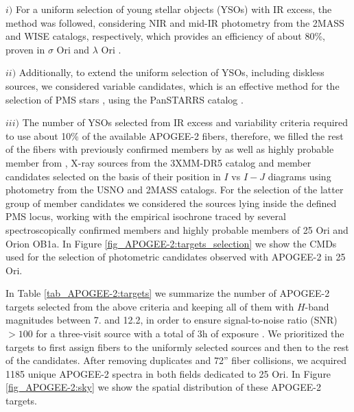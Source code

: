 \documentclass[12pt]{article}
\begin{document}
$i)$ For a uniform selection of young stellar objects (\ac{YSO}s) with IR excess, the \cite{Koenig2014} method was followed, considering NIR and mid-IR photometry from the 2MASS and WISE \citep{Cutri2013} catalogs, respectively, which provides an efficiency of about 80\%, proven in $\sigma$ Ori and $\lambda$ Ori \citep{Koenig2015}. 

$ii)$ Additionally, to extend the uniform selection of YSOs, including diskless sources, we considered variable candidates, which is an effective method for the selection of PMS stars \citep{Briceno2005,Briceno2018}, using the PanSTARRS catalog \citep{Chambers2016}. 

$iii)$ The number of YSOs selected from IR excess and variability criteria required to use about 10\% of the available APOGEE-2 fibers, therefore, we filled the rest of the fibers with previously confirmed members by \citet{Briceno2005,Briceno2007,Downes2014,Suarez2017} as well as highly probable member from \citet{Kharchenko2005}, X-ray sources from the 3XMM-DR5 catalog \citep{Rosen2015} and member candidates selected on the basis of their position in $I$ vs $I-J$ diagrams using photometry from the USNO \citep{Monet2003} and 2MASS catalogs. For the selection of the latter group of member candidates we considered the sources lying inside the defined PMS locus, working with the empirical isochrone traced by several spectroscopically confirmed members and highly probable members of 25 Ori and Orion OB1a. In Figure \ref{fig_APOGEE-2:targets_selection} we show the CMDs used for the selection of photometric candidates observed with APOGEE-2 in 25 Ori. 

In Table \ref{tab_APOGEE-2:targets} we summarize the number of APOGEE-2 targets selected from the above criteria and keeping all of them with $H$-band magnitudes between 7. and 12.2, in order to ensure signal-to-noise ratio (\ac{SNR}) $>100$ for a three-visit source with a total of 3h of exposure \citep{Majewski2017}. We prioritized the targets to first assign fibers to the uniformly selected sources and then to the rest of the candidates. After removing duplicates and 72'' fiber collisions, we acquired 1185 unique APOGEE-2 spectra in both fields dedicated to 25 Ori. In Figure \ref{fig_APOGEE-2:sky} we show the spatial distribution of these APOGEE-2 targets.
\end{document}
